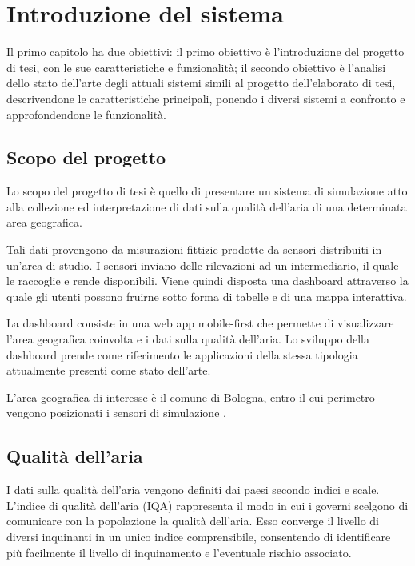 \clearpage{\pagestyle{empty}\cleardoublepage}
\chapter{Introduzione del sistema}
\lhead[\fancyplain{}{\bfseries\thepage}]{\fancyplain{}{\bfseries\rightmark}}

Il primo capitolo ha due obiettivi:
il primo obiettivo è l'introduzione del progetto di tesi, con le sue caratteristiche e funzionalità;
il secondo obiettivo è l'analisi dello stato dell'arte degli attuali sistemi simili al progetto dell'elaborato di tesi,
descrivendone le caratteristiche principali, ponendo i diversi sistemi a confronto e approfondendone le funzionalità.

\section{Scopo del progetto}

Lo scopo del progetto di tesi è quello di presentare un sistema di simulazione atto alla collezione ed interpretazione
di dati sulla qualità dell'aria di una determinata area geografica.

Tali dati provengono da misurazioni fittizie prodotte da sensori distribuiti in un'area di studio.
I sensori inviano delle rilevazioni ad un intermediario, il quale le raccoglie e rende disponibili.
Viene quindi disposta una dashboard attraverso la quale gli utenti possono fruirne sotto forma di tabelle e di una mappa interattiva.

La dashboard consiste in una web app mobile-first che permette di visualizzare l'area geografica coinvolta e
i dati sulla qualità dell'aria.
Lo sviluppo della dashboard prende come riferimento le applicazioni della stessa tipologia attualmente presenti
come stato dell'arte.

L'area geografica di interesse è il comune di Bologna, entro il cui perimetro vengono posizionati i sensori
di simulazione \cite{Accuweather}.

\section{Qualità dell'aria}
I dati sulla qualità dell'aria vengono definiti dai paesi secondo indici e scale.
L'indice di qualità dell'aria (IQA) rappresenta il modo in cui i governi scelgono di comunicare con la popolazione
la qualità dell'aria. Esso converge il livello di diversi inquinanti in un unico indice comprensibile,
consentendo di identificare più facilmente il livello di inquinamento e l'eventuale rischio associato.

